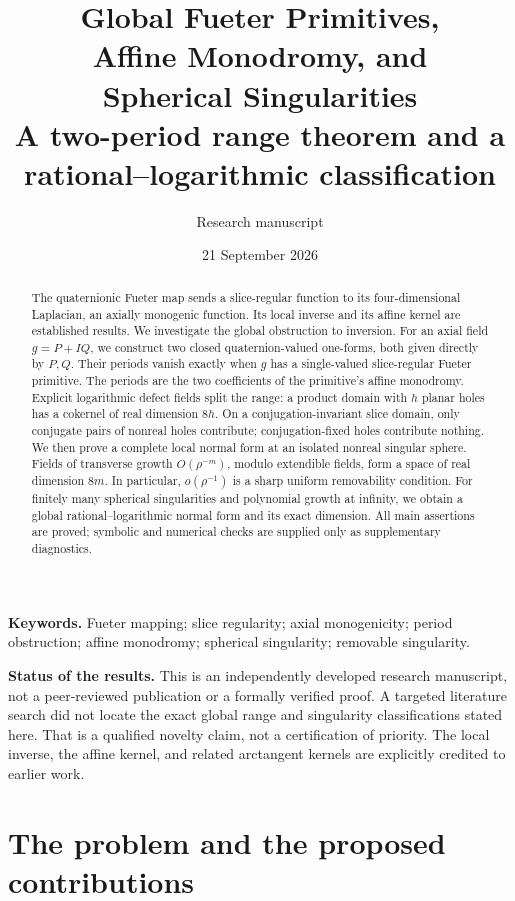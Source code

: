 \documentclass[11pt,a4paper]{article}
\title{\vspace{-10mm}\textbf{Global Fueter Primitives,\protect\\
Affine Monodromy, and\protect\\Spherical Singularities}\\[5pt]
\large A two-period range theorem and a rational--logarithmic classification}
\author{Research manuscript}
\date{21 September 2026}
\numberwithin{equation}{section}
\theoremstyle{definition}
\theoremstyle{remark}
\begin{document}
\maketitle
\thispagestyle{empty}
\begin{abstract}
The quaternionic Fueter map sends a slice-regular function to its
four-dimensional Laplacian, an axially monogenic function. Its local inverse
and its affine kernel are established results. We investigate the global
obstruction to inversion. For an axial field $g=P+IQ$, we construct two
closed quaternion-valued one-forms, both given directly by $P,Q$. Their
periods vanish exactly when $g$ has a single-valued slice-regular Fueter
primitive. The periods are the two coefficients of the primitive's affine
monodromy. Explicit logarithmic defect fields split the range: a product
domain with $h$ planar holes has a cokernel of real dimension $8h$.
On a conjugation-invariant slice domain, only conjugate pairs of nonreal
holes contribute; conjugation-fixed holes contribute nothing.
We then prove a complete local normal form at an isolated nonreal
singular sphere. Fields of transverse growth $O(\rho^{-m})$, modulo
extendible fields, form a space of real dimension $8m$. In particular,
$o(\rho^{-1})$ is a sharp uniform removability condition. For finitely
many spherical singularities and polynomial growth at infinity, we obtain
a global rational--logarithmic normal form and its exact dimension.
All main assertions are proved; symbolic and numerical checks are supplied
only as supplementary diagnostics.
\end{abstract}
\medskip
\noindent\textbf{Keywords.} Fueter mapping; slice regularity; axial monogenicity;
period obstruction; affine monodromy; spherical singularity; removable singularity.

\medskip
\noindent\textbf{Status of the results.} This is an independently developed research
manuscript, not a peer-reviewed publication or a formally verified proof.
A targeted literature search did not locate the exact global range and
singularity classifications stated here. That is a qualified novelty claim,
not a certification of priority. The local inverse, the affine kernel, and
related arctangent kernels are explicitly credited to earlier work.
\newpage
\begingroup
\small
\setlength{\parskip}{0pt}
\makeatletter
\patchcmd{\l@section}{1.0em}{0.55em}{}{}
\makeatother
\tableofcontents
\endgroup
\newpage

\section{The problem and the proposed contributions}
\label{sec:intro}
\end{document}
